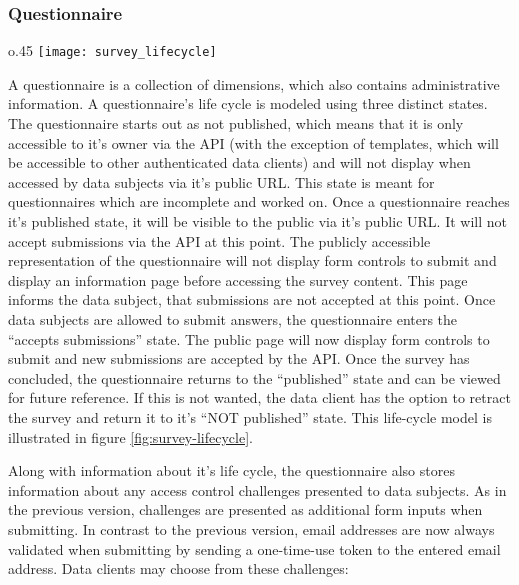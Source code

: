     \subsubsection{Questionnaire}
        \begin{wrapfigure}{o}{.45\textwidth}
            \centering
            \texttt{[image: survey\_lifecycle]}
            \caption{Questionnaire life-cycle}
            \label{fig:survey-lifecycle}
        \end{wrapfigure}
        A questionnaire is a collection of dimensions, which also contains administrative
        information. A questionnaire's life cycle is modeled using three
        distinct states. The questionnaire starts out as not published,
        which means that it is only accessible to it's owner via the API
        (with the exception of templates, which will be accessible to other
        authenticated data clients)
        and will not display when accessed by data subjects via it's
        public URL. This state is meant for questionnaires which are
        incomplete and worked on. Once a questionnaire reaches it's
        published state, it will be visible to the public via it's
        public URL. It will not accept submissions via the API at this point.
        The publicly accessible representation of the questionnaire will
        not display form controls to submit and display an information
        page before accessing the survey content. This page informs the data subject,
        that submissions are not accepted at this point. Once data subjects
        are allowed to submit answers, the questionnaire enters
        the ``accepts submissions'' state. The public page will now display
        form controls to submit and new submissions are accepted by the API.
        Once the survey has concluded, the questionnaire returns to
        the ``published'' state and can be viewed for future reference.
        If this is not wanted, the data client has the option to retract
        the survey and return it to it's ``NOT published'' state.
        This life-cycle model is illustrated in figure \ref{fig:survey-lifecycle}.

        Along with information about it's life cycle, the questionnaire
        also stores information about any access control challenges
        presented to data subjects. As in the previous version, challenges
        are presented as additional form inputs when submitting. 
        In contrast to the previous version, email addresses are now always
        validated when submitting by sending a one-time-use token to the
        entered email address.
        Data clients may choose from these challenges:
        
